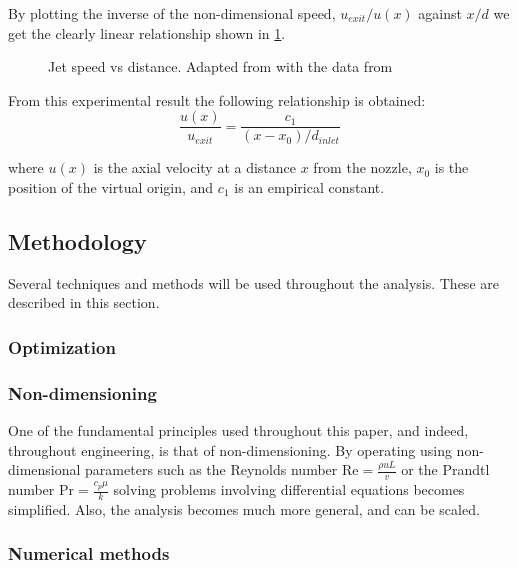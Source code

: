 \noindent By plotting the inverse of the non-dimensional speed, $u_{exit}/u(x)$ against $x/d$ we get the clearly linear relationship shown in \cref{fig:jetSpeed}.

\begin{figure}[H]
\begin{centering}
\caption{Jet speed vs distance. Adapted from \cite{pope2000} with the data from \cite{hussein1994}}
\label{fig:jetSpeed}
\end{centering}
\end{figure}

\noindent From this experimental result the following relationship is obtained: 
\begin{equation}
\label{equ:axialSpeed}
\frac{u(x)}{u_{exit}} = \frac{c_1}{\left(x-x_0\right)/d_{inlet}}
\end{equation}

\noindent where $u(x)$ is the axial velocity at a distance $x$ from the nozzle, $x_0$ is the position of the virtual origin, and $c_1$ is an empirical constant.

\subsection{Methodology}

Several techniques and methods will be used throughout the analysis. These are described in this section.

\subsubsection{Optimization}
\subsubsection{Non-dimensioning}

One of the fundamental principles used throughout this paper, and indeed, throughout engineering, is that of non-dimensioning. By operating using non-dimensional parameters such as the Reynolds number $\text{Re} = \frac{\rho u L}{v}$ or the Prandtl number $\text{Pr} = \frac{c_p \mu}{k}$ solving problems involving differential equations becomes simplified. Also, the analysis becomes much more general, and can be scaled.

\subsubsection{Numerical methods}
\label{sec:numerical_methods}
